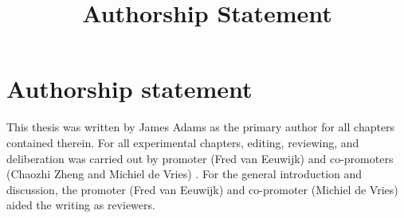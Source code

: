 \documentclass[
]{article}
\title{Authorship Statement}
\author{}
\date{}
\begin{document}
\maketitle


\section{Authorship statement}\label{authorship-statement}

This thesis was written by James Adams as the primary author for all
chapters contained therein. For all experimental chapters, editing,
reviewing, and deliberation was carried out by promoter (Fred van
Eeuwijk) and co-promoters (Chaozhi Zheng and Michiel de Vries) . For the
general introduction and discussion, the promoter (Fred van Eeuwijk) and
co-promoter (Michiel de Vries) aided the writing as reviewers.


\printbibliography
\end{document}
